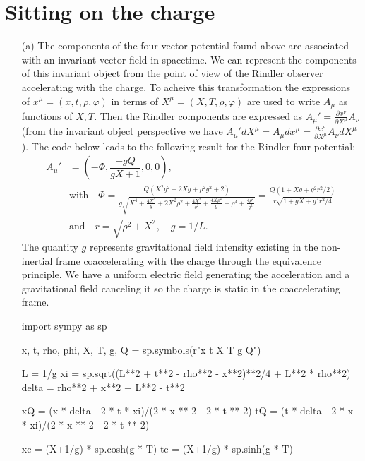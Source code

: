 \documentclass[10pt, a4paper]{article}
\begin{document}
\section{Sitting on the charge}
\begin{enumerate}
  \item[(a)] The components of the four-vector potential found above are associated with an invariant vector field in spacetime. We can represent the components of this invariant object from the point of view of the Rindler observer accelerating with the charge. To acheive this transformation the expressions of $x^{\mu} = (x, t, \rho, \varphi)$ in terms of $X^{\mu} = (X, T, \rho, \varphi)$ are used to write $A_\mu$ as functions of $X, T$. Then the Rindler components are expressed as $A_\mu' = \frac{\partial x^\nu}{\partial X^{\mu}} A_\nu$ (from the invariant object perspective we have $A_\mu' dX^{\mu} = A_\mu dx^{\mu} =  \frac{\partial x^\nu}{\partial X^{\mu}} A_\nu dX^{\mu}$). The code below leads to the following result for the Rindler four-potential:
  \begin{align*}
    A_{\mu}' &= \left(-\Phi, \dfrac{-gQ}{gX+1}, 0, 0\right),\\
     &\text{with}\quad \Phi = \frac{Q \left(X^{2} g^{2} + 2 X g + \rho^{2} g^{2} + 2\right)}{g \sqrt{X^{4} + \frac{4 X^{3}}{g} + 2 X^{2} \rho^{2} + \frac{4 X^{2}}{g^{2}} + \frac{4 X \rho^{2}}{g} + \rho^{4} + \frac{4 \rho^{2}}{g^{2}}}} = \frac{Q \left(1 + X g + g^{2} r^2/2\right)}{r\sqrt{1 + g X + g^2 r^2/4}}\\
     &\text{and}  \quad r = \sqrt{\rho^2 + X^2}, \quad g = 1/L.
  \end{align*}
  The quantity $g$ represents gravitational field intensity existing in the non-inertial frame coaccelerating with the charge through the equivalence principle. We have a uniform electric field generating the acceleration and a gravitational field canceling it so the charge is static in the coaccelerating frame. 
  \begin{python}
import sympy as sp 

x, t, rho, phi, X, T, g, Q = sp.symbols(r"x t \rho \varphi X T g Q")

L = 1/g
xi = sp.sqrt((L**2 + t**2 - rho**2 - x**2)**2/4 + L**2 * rho**2)
delta = rho**2 + x**2 + L**2 - t**2

xQ = (x * delta - 2 * t * xi)/(2 * x ** 2 - 2 * t ** 2)
tQ = (t * delta - 2 * x * xi)/(2 * x ** 2 - 2 * t ** 2)

xc = (X+1/g) * sp.cosh(g * T)
tc = (X+1/g) * sp.sinh(g * T)


\end{python}
\end{enumerate}
\end{document}
